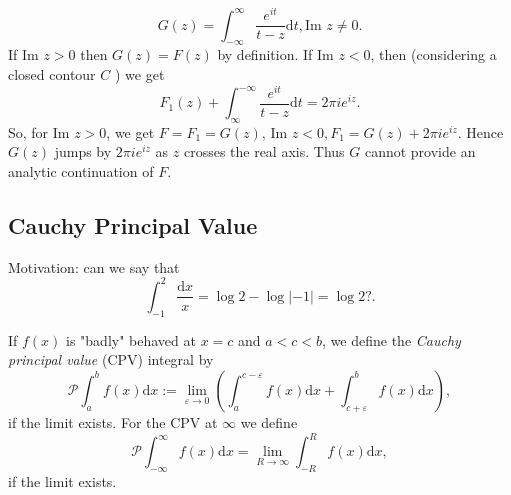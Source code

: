 \documentclass[a4paper]{article}
\begin{document}
\begin{enumerate}
\begin{eg}
            \[
                G(z) = \int_{-\infty}^{\infty} \frac{e^{i t}}{ t - z} \text{d}t,  \text{Im } z \ne 0
            .\] 
            If $\text{Im } z > 0$ then $G(z) = F(z) $ by definition. If $\text{Im } z < 0$, then (considering a closed contour $C$ ) we get 
            \[
                F_1(z) + \int_{\infty}^{-\infty} \frac{e^{ i t }}{ t - z}\text{d}t = 2 \pi i e^{ i z}
            .\] 
            So, for $\text{Im } z > 0$, we get $F = F_1 = G(z)$, $\text{Im } z < 0, F_1 = G(z) + 2 \pi i e^{ i z}$. Hence $G(z)$ jumps by $2  \pi i e^{ i z}$ as $z$ crosses the real axis. Thus $G$ cannot provide an analytic continuation of $F$.
        \end{eg}
\end{enumerate}
\subsection{Cauchy Principal Value}
Motivation: can we say that
\[
\int_{-1}^{2} \frac{\text{d}x }{x} = \log 2 - \log |-1|  = \log 2 \text{?}
.\] 
\begin{defi}
    If $f(x)$ is "badly" behaved at  $x = c$ and $a < c < b$, we define the \emph{Cauchy principal value} (CPV) integral by
    \[
        \mathcal{P} \int_{a}^{b} f(x) \text{d}x := \lim_{\varepsilon \to 0} \left(\int_{a}^{ c - \varepsilon} f(x) \text{d}x + \int_{c + \varepsilon}^{b} f(x) \text{d}x \right)
    ,\]
    if the limit exists. For the CPV at $\infty$ we define
    \[
        \mathcal{P} \int_{-\infty}^{\infty} f(x) \text{d}x = \lim_{ R \to \infty} \int_{-R}^{R} f(x) \text{d}x 
    ,\]
    if the limit exists.
    \end{defi}
\end{document}
